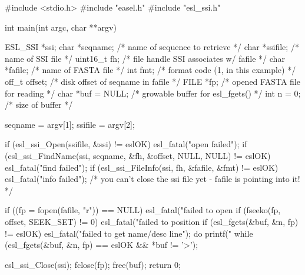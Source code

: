 \begin{cchunk}
#include <stdio.h>
#include "easel.h"
#include "esl_ssi.h"

int main(int argc, char **argv)
{
  ESL_SSI *ssi;
  char    *seqname;             /* name of sequence to retrieve         */
  char    *ssifile;             /* name of SSI file                     */
  uint16_t fh;                  /* file handle SSI associates w/ fafile */
  char    *fafile;              /* name of FASTA file                   */
  int      fmt;                 /* format code (1, in this example)     */
  off_t    offset;              /* disk offset of seqname in fafile     */
  FILE    *fp;                  /* opened FASTA file for reading        */
  char    *buf = NULL;          /* growable buffer for esl_fgets()      */
  int      n = 0;               /* size of buffer                       */

  seqname = argv[1];
  ssifile = argv[2];

  if (esl_ssi_Open(ssifile, &ssi)                              != eslOK) esl_fatal("open failed");
  if (esl_ssi_FindName(ssi, seqname, &fh, &offset, NULL, NULL) != eslOK) esl_fatal("find failed");
  if (esl_ssi_FileInfo(ssi, fh, &fafile, &fmt)                 != eslOK) esl_fatal("info failed");
  /* you can't close the ssi file yet - fafile is pointing into it! */

  if ((fp = fopen(fafile, "r"))     == NULL)  esl_fatal("failed to open %
  if (fseeko(fp, offset, SEEK_SET)  != 0)     esl_fatal("failed to position %
  if (esl_fgets(&buf, &n, fp)       != eslOK) esl_fatal("failed to get name/desc line");
  do {
    printf("%
  } while (esl_fgets(&buf, &n, fp) == eslOK && *buf != '>');
  
  esl_ssi_Close(ssi);  
  fclose(fp);  
  free(buf);
  return 0;
}
\end{cchunk}
